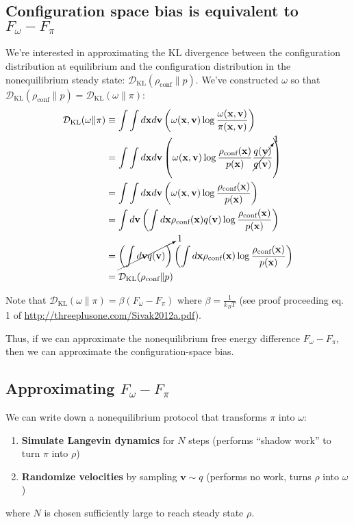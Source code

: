 \documentclass[11pt]{article}
\newcommand{\x}{\mathbf{x}}
\newcommand{\vel}{\mathbf{v}}
\newcommand{\kldiv}{\mathcal{D}_\text{KL}}
\newcommand{\conf}{\rho_\text{conf}}
\begin{document}
\subsection{Configuration space bias is equivalent to $F_\omega - F_\pi$}
We're interested in approximating the KL divergence between the configuration distribution at equilibrium and the configuration distribution in the nonequilibrium steady state: $\kldiv(\conf \| p)$.
We've constructed $\omega$ so that $\kldiv(\conf \| p) = \kldiv( \omega \| \pi)$:
$$\begin{aligned}
\kldiv(\omega \| \pi) &\equiv \int \int d \x d\vel \left( \omega(\x, \vel) \log \frac{\omega(\x, \vel)}{\pi(\x, \vel)} \right)\\
&= \int \int d \x d\vel \left( \omega(\x, \vel) \log \frac{\conf (\x)}{p(\x)}  \cancelto{1}{\frac{q(\vel)}{q(\vel)}}\right)\\
&= \int \int d \x d\vel \left( \omega(\x, \vel) \log \frac{\conf (\x)}{p(\x)}  \right)\\
&= \int d \vel \left( \int d \x \conf (\x) q(\vel) \log \frac{\conf (\x)}{p(\x)} \right) \\
&= \cancelto{1}{\left( \int d \vel q(\vel) \right)} \left( \int d \x \conf (\x) \log \frac{\conf (\x)}{p(\x)} \right) \\
&= \kldiv(\conf \| p)
\end{aligned}
$$


Note that $\kldiv(\omega \| \pi) = \beta (F_\omega - F_\pi)$ where $\beta = \frac{1}{k_B T}$ (see proof proceeding eq. 1 of \url{http://threeplusone.com/Sivak2012a.pdf}).

Thus, if we can approximate the nonequilibrium free energy difference $F_\omega - F_\pi$, then we can approximate the configuration-space bias.

\subsection{Approximating $F_\omega - F_\pi$}
We can write down a nonequilibrium protocol that transforms $\pi$ into $\omega$:
\begin{enumerate}
\item \textbf{Simulate Langevin dynamics} for $N$ steps (performs ``shadow work'' to turn $\pi$ into $\rho$)
\item \textbf{Randomize velocities} by sampling $\vel \sim q$ (performs no work, turns $\rho$ into $\omega$)
\end{enumerate}
where $N$ is chosen sufficiently large to reach steady state $\rho$.
\end{document}
